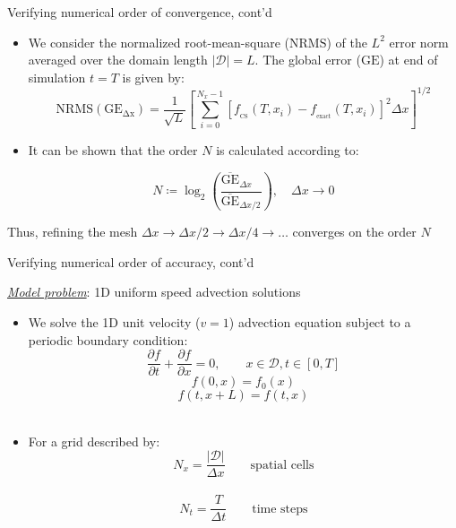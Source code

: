 \documentclass{beamer}
\begin{document}
\begin{frame}{Verifying numerical order of convergence, cont'd}
\begin{itemize}
\item We consider the normalized root-mean-square ($\mathrm{NRMS}$) of the $L^2$ error norm averaged over the domain length $|\mathcal{D}| = L$. The global error ($\mathrm{GE}$) at end of simulation $t = T$ is given by:
$$\mathrm{NRMS(GE_{\Delta x})} = \frac{1}{\sqrt{L}}\left[\sum\limits_{i = 0}^{N_x - 1} [f_{_{\mathrm{CS}}}(T,x_i) - f_{_{\mathrm{exact}}}(T,x_i)]^2\Delta x\right]^{1/2}$$
\item It can be shown that the order $N$ is calculated according to:

$$N \coloneqq \log_2 \left(\frac{\overline{\text{GE}}_{\Delta x\phantom{/ 2}}}{\overline{\text{GE}}_{\Delta x / 2}} \right), \quad \Delta x \rightarrow 0 $$
  \end{itemize}

Thus, refining the mesh $\Delta x \rightarrow \Delta x / 2 \rightarrow \Delta x / 4 \rightarrow \ldots $ converges on the order $N$

\end{frame}



\begin{frame}{Verifying numerical order of accuracy, cont'd}

\emph{\underline{Model problem}}: 1D uniform speed advection solutions
    \begin{itemize}
    \item We solve the 1D unit velocity ($v = 1$) advection equation subject to a periodic boundary condition:
        $$\frac{\partial f}{\partial t} + \frac{\partial f}{\partial x} =  0, \qquad x\in\mathcal{D}, t\in [0,T]$$
        $$f(0,x) = f_0(x)$$
        $$f(t,x + L) = f(t,x) $$\\[0.5em]
    \item For a grid described by:
        $$N_x = \frac{|\mathcal{D}|}{\Delta x} \qquad \text{spatial cells}$$ \\[0.5em]
        $$N_t = \frac{T}{\Delta t} \qquad \text{time steps}$$ 
    \end{itemize}
 

\end{frame}
\end{document}
